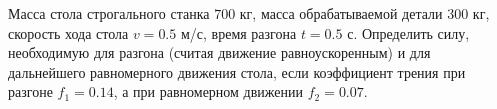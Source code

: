 Масса стола строгального станка $700$ кг,
масса обрабатываемой детали $300$ кг,
скорость хода стола $v = 0.5$ м/с,
время разгона $t = 0.5$ с.
Определить силу, необходимую для разгона (считая движение равноускоренным)
и для дальнейшего равномерного движения стола, если коэффициент трения
при разгоне $f_1 = 0.14$, а при равномерном движении $f_2 = 0.07$.
